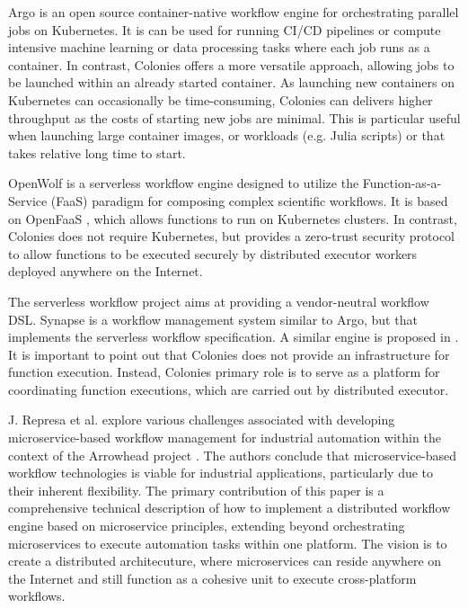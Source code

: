 \documentclass{article}
\begin{document}
Argo \cite{argowf} is an open source container-native workflow engine for orchestrating parallel jobs on Kubernetes. It is can be used for running CI/CD pipelines or compute intensive machine learning or data processing tasks where each job runs as a container. In contrast, Colonies offers a more versatile approach, allowing jobs to be launched within an already started container. As launching new containers on Kubernetes can occasionally be time-consuming, Colonies can delivers higher throughput as the costs of starting new jobs are minimal. This is particular useful when launching large container images, or workloads (e.g. Julia scripts) or that takes relative long time to start. 

OpenWolf \cite{openwolf} is a serverless workflow engine designed to utilize the Function-as-a-Service (FaaS) paradigm for composing complex scientific workflows. It is based on OpenFaaS \cite{openfaas}, which allows functions to run on Kubernetes clusters. In contrast, Colonies does not require Kubernetes, but provides a zero-trust security protocol to allow functions to be executed securely by distributed executor workers deployed anywhere on the Internet.

The serverless workflow project \cite{serverlessworkflows} aims at providing a vendor-neutral workflow DSL. Synapse \cite{synapse} is a workflow management system similar to Argo, but that implements the serverless workflow specification. A similar engine is proposed in \cite{scafe}. It is important to point out that Colonies does not provide an infrastructure for function execution. Instead, Colonies primary role is to serve as a platform for coordinating function executions, which are carried out by distributed executor.

J. Represa et al. \cite{GarciaRepresa1740746, GarciaRepresa1640771} explore various challenges associated with developing microservice-based workflow management for industrial automation within the context of the Arrowhead project \cite{delsing2017iot}. The authors conclude that microservice-based workflow technologies is viable for industrial applications, particularly due to their inherent flexibility. The primary contribution of this paper is a comprehensive technical description of how to implement a distributed workflow engine based on microservice principles, extending beyond orchestrating microservices to execute automation tasks within one platform. The vision is to create a distributed architecuture, where microservices can reside anywhere on the Internet and still function as a cohesive unit to execute cross-platform workflows.  
\end{document}
